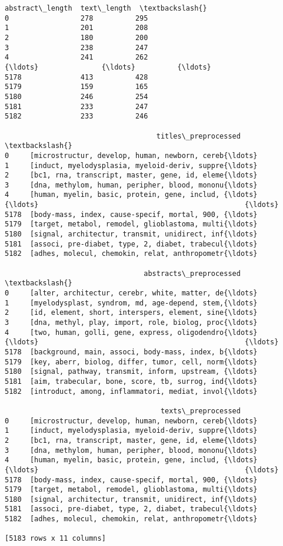 \documentclass[11pt]{article}
\begin{document}
\begin{tcolorbox}[breakable, size=fbox, boxrule=.5pt, pad at break*=1mm, opacityfill=0]
\begin{Verbatim}[commandchars=\\\{\}]
      abstract\_length  text\_length  \textbackslash{}
0                 278          295
1                 201          208
2                 180          200
3                 238          247
4                 241          262
{\ldots}               {\ldots}          {\ldots}
5178              413          428
5179              159          165
5180              246          254
5181              233          247
5182              233          246

                                    titles\_preprocessed  \textbackslash{}
0     [microstructur, develop, human, newborn, cereb{\ldots}
1     [induct, myelodysplasia, myeloid-deriv, suppre{\ldots}
2     [bc1, rna, transcript, master, gene, id, eleme{\ldots}
3     [dna, methylom, human, peripher, blood, mononu{\ldots}
4     [human, myelin, basic, protein, gene, includ, {\ldots}
{\ldots}                                                 {\ldots}
5178  [body-mass, index, cause-specif, mortal, 900, {\ldots}
5179  [target, metabol, remodel, glioblastoma, multi{\ldots}
5180  [signal, architectur, transmit, unidirect, inf{\ldots}
5181  [associ, pre-diabet, type, 2, diabet, trabecul{\ldots}
5182  [adhes, molecul, chemokin, relat, anthropometr{\ldots}

                                 abstracts\_preprocessed  \textbackslash{}
0     [alter, architectur, cerebr, white, matter, de{\ldots}
1     [myelodysplast, syndrom, md, age-depend, stem,{\ldots}
2     [id, element, short, interspers, element, sine{\ldots}
3     [dna, methyl, play, import, role, biolog, proc{\ldots}
4     [two, human, golli, gene, express, oligodendro{\ldots}
{\ldots}                                                 {\ldots}
5178  [background, main, associ, body-mass, index, b{\ldots}
5179  [key, aberr, biolog, differ, tumor, cell, norm{\ldots}
5180  [signal, pathway, transmit, inform, upstream, {\ldots}
5181  [aim, trabecular, bone, score, tb, surrog, ind{\ldots}
5182  [introduct, among, inflammatori, mediat, invol{\ldots}

                                     texts\_preprocessed
0     [microstructur, develop, human, newborn, cereb{\ldots}
1     [induct, myelodysplasia, myeloid-deriv, suppre{\ldots}
2     [bc1, rna, transcript, master, gene, id, eleme{\ldots}
3     [dna, methylom, human, peripher, blood, mononu{\ldots}
4     [human, myelin, basic, protein, gene, includ, {\ldots}
{\ldots}                                                 {\ldots}
5178  [body-mass, index, cause-specif, mortal, 900, {\ldots}
5179  [target, metabol, remodel, glioblastoma, multi{\ldots}
5180  [signal, architectur, transmit, unidirect, inf{\ldots}
5181  [associ, pre-diabet, type, 2, diabet, trabecul{\ldots}
5182  [adhes, molecul, chemokin, relat, anthropometr{\ldots}

[5183 rows x 11 columns]
\end{Verbatim}
\end{tcolorbox}
        
\end{document}
